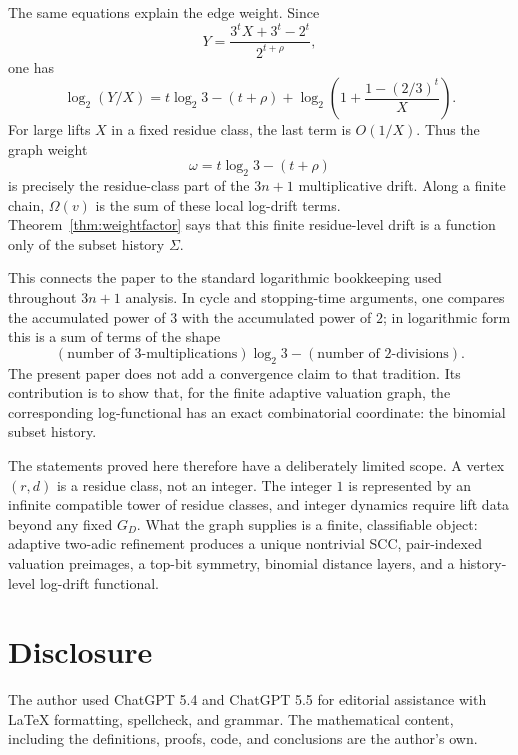 \documentclass[11pt]{amsart}
\theoremstyle{definition}
\theoremstyle{remark}
\begin{document}
The same equations explain the edge weight.  Since
\[
Y=\frac{3^tX+3^t-2^t}{2^{t+\rho}},
\]
one has
\[
\log_2(Y/X)
=
t\log_2 3-(t+\rho)
+
\log_2\!\left(1+\frac{1-(2/3)^t}{X}\right).
\]
For large lifts $X$ in a fixed residue class, the last term is $O(1/X)$.  Thus the graph weight
\[
\omega=t\log_2 3-(t+\rho)
\]
is precisely the residue-class part of the $3n+1$ multiplicative drift.  Along a finite chain, $\Omega(v)$ is the sum of these local log-drift terms.  Theorem~\ref{thm:weightfactor} says that this finite residue-level drift is a function only of the subset history $\Sigma$.

This connects the paper to the standard logarithmic bookkeeping used throughout $3n+1$ analysis.  In cycle and stopping-time arguments, one compares the accumulated power of $3$ with the accumulated power of $2$; in logarithmic form this is a sum of terms of the shape
\[
(\text{number of }3\text{-multiplications})\log_2 3
-
(\text{number of }2\text{-divisions}).
\]
The present paper does not add a convergence claim to that tradition.  Its contribution is to show that, for the finite adaptive valuation graph, the corresponding log-functional has an exact combinatorial coordinate: the binomial subset history.

The statements proved here therefore have a deliberately limited scope.  A vertex $(r,d)$ is a residue class, not an integer.  The integer $1$ is represented by an infinite compatible tower of residue classes, and integer dynamics require lift data beyond any fixed $G_D$.  What the graph supplies is a finite, classifiable object: adaptive two-adic refinement produces a unique nontrivial SCC, pair-indexed valuation preimages, a top-bit symmetry, binomial distance layers, and a history-level log-drift functional.

\section*{Disclosure}\label{sec:disclosure}
The author used ChatGPT 5.4 and ChatGPT 5.5 for editorial assistance with LaTeX formatting, spellcheck, and grammar. The mathematical content, including the definitions, proofs, code, and conclusions are the author's own.
\end{document}
